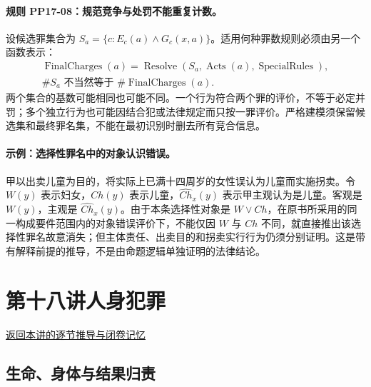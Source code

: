 \paragraph{规则 PP17-08：规范竞争与处罚不能重复计数。}
\mbox{}\par
设候选罪集合为 $S_a=\{c:E_c(a)\land G_c(x,a)\}$。适用何种罪数规则必须由另一个函数表示：
\[
\begin{gathered}
\operatorname{FinalCharges}(a)
=\operatorname{Resolve}(S_a,\operatorname{Acts}(a),\operatorname{SpecialRules}),\\
\#S_a\text{ 不当然等于 }\#\operatorname{FinalCharges}(a).
\end{gathered}
\]
两个集合的基数可能相同也可能不同。一个行为符合两个罪的评价，不等于必定并罚；多个独立行为也可能因结合犯或法律规定而只按一罪评价。严格建模须保留候选集和最终罪名集，不能在最初识别时删去所有竞合信息。

\paragraph{示例：选择性罪名中的对象认识错误。}
\mbox{}\par
甲以出卖儿童为目的，将实际上已满十四周岁的女性误认为儿童而实施拐卖。令 $W(y)$ 表示妇女，$Ch(y)$ 表示儿童，$\widehat{Ch}_x(y)$ 表示甲主观认为是儿童。客观是 $W(y)$，主观是 $\widehat{Ch}_x(y)$。由于本条选择性对象是 $W\lor Ch$，在原书所采用的同一构成要件范围内的对象错误评价下，不能仅因 $W$ 与 $Ch$ 不同，就直接推出该选择性罪名故意消失；但主体责任、出卖目的和拐卖实行行为仍须分别证明。这是带有解释前提的推导，不是由命题逻辑单独证明的法律结论。

\section{第十八讲\quad 人身犯罪}

\label{ref:lecture:18}

\noindent\hyperref[lecture:18]{返回本讲的逐节推导与闭卷记忆}

\subsection{生命、身体与结果归责}
